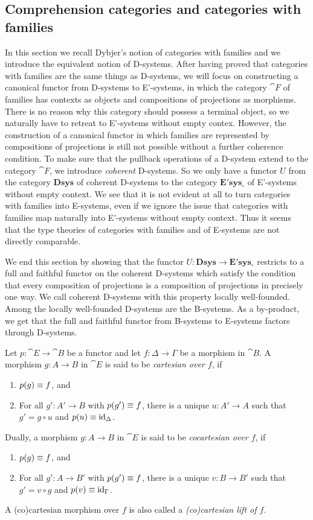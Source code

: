 \subsection{Comprehension categories and categories with families}
In this section we recall Dybjer's notion of categories with families and we
introduce the equivalent notion of D-systems. After having proved that categories with families
are the same things as D-systems, we will focus on constructing a canonical functor from
D-systems to E'-systems, in which the category $\cat{F}$ of families has contexts
as objects and compositions of projections as morphisms. There is no reason why
this category should possess a terminal object, so we naturally have to retreat
to E'-systems without empty contex. However, the construction of a
canonical functor in which families are represented by compositions of projections
is still not possible without a further coherence condition. To make sure that
the pullback operations of a D-system extend to the category
$\cat{F}$, we introduce \emph{coherent} D-systems. So we only have a functor $U$
from the category $\mathbf{Dsys}$ of coherent D-systems to the category
$\mathbf{E'sys_{\circ}}$ of E'-systems without empty context.
We see that it is not evident at all to turn categories with families into
E-systems, even if we ignore the issue that categories with families map
naturally into E'-systems without empty context.
Thus it seems that the type theories of categories with families and of E-systems
are not directly comparable.

We end this section by showing that the functor 
$U:\mathbf{Dsys}\to\mathbf{E'sys_{\circ}}$ restricts to a full and faithful 
functor on the coherent D-systems which satisfy the condition that every 
composition of projections is a composition of projections in precisely one way.
We call coherent D-systems with this property
locally well-founded. Among the locally well-founded D-systems are the B-systems.
As a by-product, we get that the full and faithful functor from B-systems to
E-systems factors through D-systems. 

\begin{defn}
Let $p:\cat{E}\to\cat{B}$ be a functor and let $f:\Delta\to \Gamma$ be a morphism in $\cat{B}$.
A morphism $g:A\to B$ in $\cat{E}$ is said to be \emph{cartesian over $f$}, if
\begin{enumerate}
\item $p(g)\equiv f$, and 
\item For all $g':A'\to B$ with $p(g')\equiv f$, there is a unique $u:A'\to A$
such that $g'=g\circ u$ and $p(u)\equiv{\mathrm{id}_{\Delta}}$. 
\end{enumerate}
Dually, a morphism $g:A\to B$ in $\cat{E}$ is said to be \emph{cocartesian over
$f$}, if
\begin{enumerate}
\item $p(g)\equiv f$, and
\item For all $g':A\to B'$ with $p(g')\equiv f$, there is a unique $v:B\to B'$
such that $g'=v\circ g$ and $p(v)\equiv{\mathrm{id}_{\Gamma}}$. 
\end{enumerate}
A (co)cartesian morphism over $f$ is also called a \emph{(co)cartesian lift of $f$}.
\end{defn}

